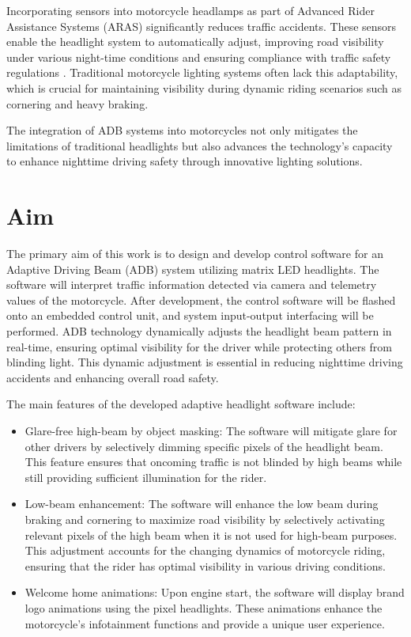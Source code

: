 Incorporating sensors into motorcycle headlamps as part of Advanced Rider Assistance Systems (ARAS) significantly reduces traffic accidents. These sensors enable the headlight system to automatically adjust, improving road visibility under various night-time conditions and ensuring compliance with traffic safety regulations \cite{ARAS-traffic-accidents} \cite{Digital_light_2} \cite{Digital_light_3}. Traditional motorcycle lighting systems often lack this adaptability, which is crucial for maintaining visibility during dynamic riding scenarios such as cornering and heavy braking.

The integration of ADB systems into motorcycles not only mitigates the limitations of traditional headlights but also advances the technology's capacity to enhance nighttime driving safety through innovative lighting solutions.

\section{Aim } 

The primary aim of this work is to design and develop control software for an Adaptive Driving Beam (ADB) system utilizing matrix LED headlights. The software will interpret traffic information detected via camera and telemetry values of the motorcycle. After development, the control software will be flashed onto an embedded control unit, and system input-output interfacing will be performed. ADB technology dynamically adjusts the headlight beam pattern in real-time, ensuring optimal visibility for the driver while protecting others from blinding light. This dynamic adjustment is essential in reducing nighttime driving accidents and enhancing overall road safety.

The main features of the developed adaptive headlight software include:

\begin{itemize}
    \item Glare-free high-beam by object masking: The software will mitigate glare for other drivers by selectively dimming specific pixels of the headlight beam. This feature ensures that oncoming traffic is not blinded by high beams while still providing sufficient illumination for the rider.
    \item Low-beam enhancement: The software will enhance the low beam during braking and cornering to maximize road visibility by selectively activating relevant pixels of the high beam when it is not used for high-beam purposes. This adjustment accounts for the changing dynamics of motorcycle riding, ensuring that the rider has optimal visibility in various driving conditions.
    \item Welcome home animations: Upon engine start, the software will display brand logo animations using the pixel headlights. These animations enhance the motorcycle's infotainment functions and provide a unique user experience.
\end{itemize}


